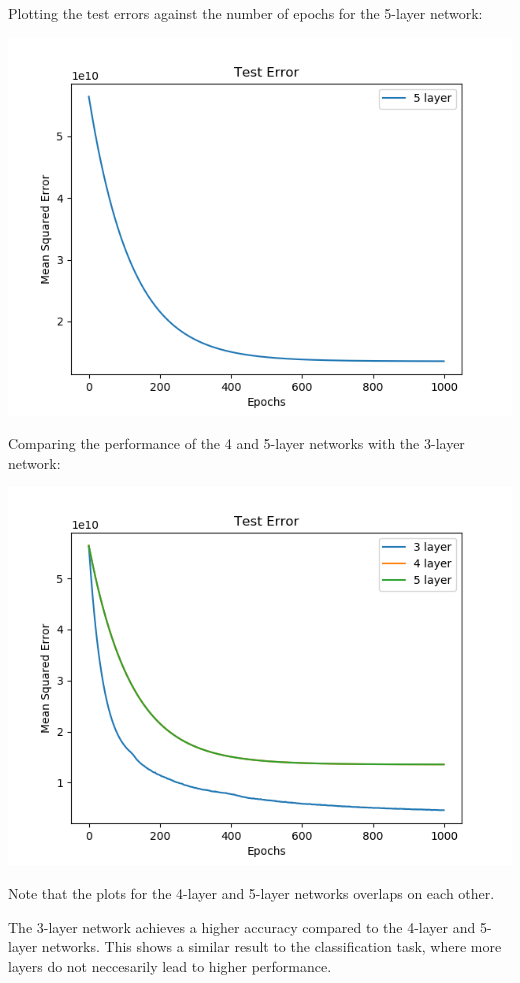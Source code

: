 Plotting the test errors against the number of epochs for the 5-layer
network:

\begin{center}
    \includegraphics[width=\imgw]{images/p1b4_5layer_test.png}   
\end{center}

Comparing the performance of the 4 and 5-layer networks with the 3-layer
network:

\begin{center}
    \includegraphics[width=\imgw]{images/p1b4_compare.png}
\end{center}

Note that the plots for the 4-layer and 5-layer networks
overlaps on each other.

The 3-layer network achieves a higher accuracy compared to the 4-layer
and 5-layer networks. This shows a similar result to the classification task,
where more layers do not neccesarily lead to higher performance.
